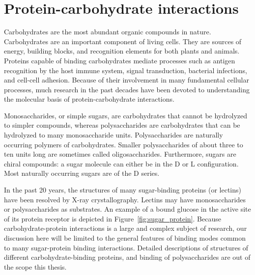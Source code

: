 \section{Protein-carbohydrate interactions}
Carbohydrates are the most abundant organic compounds in nature.  Carbohydrates are an important component of living cells.  They are sources of energy, building blocks, and recognition elements for both plants and animals.  Proteins capable of binding carbohydrates mediate processes such as antigen recognition by the host immune system,\cite{vanRozendaal:2000fi,Reid:1998tw} signal transduction,\cite{Rudd:2001te} bacterial infections,\cite{Karlsson:1999ta} and cell-cell adhesion.\cite{Rogers:1983wp} 
Because of their involvement in many fundamental cellular processes, much research in the past decades have been devoted to understanding the molecular basis of protein-carbohydrate interactions. 

Monosaccharides, or simple sugars, are carbohydrates that cannot be hydrolyzed to simpler compounds, whereas polysaccharides are carbohydrates that can be hydrolyzed to many monosaccharide units. Polysaccharides are naturally occurring polymers of carbohydrates. Smaller polysaccharides of about three to ten units long are sometimes called oligosaccharides.  Furthermore, sugars are chiral compounds: a sugar molecule can either be in the D or L configuration. Most naturally occurring sugars are of the D series.

In the past 20 years, the structures of many sugar-binding proteins (or lectins) have been resolved by X-ray crystallography.\cite{Rini:1995p2497} Lectins may have monosaccharides or polysaccharides as substrates. An example of a bound glucose in the active site of its protein receptor is depicted in Figure~\ref{fig:sugar_protein}. Because carbohydrate-protein interactions is a large and complex subject of research, our discussion here will be limited to the general features of binding modes common to many sugar-protein binding interactions. Detailed descriptions of structures of different carbohydrate-binding proteins, and binding of polysaccharides are out of the scope this thesis.

